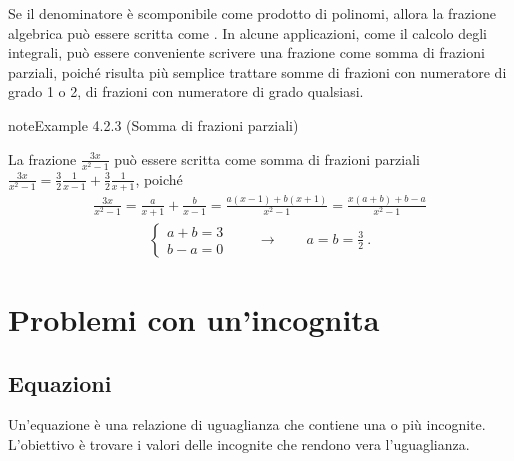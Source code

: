 \documentclass[letterpaper,10pt,italian]{jupyterBook}
\begin{document}
\sphinxAtStartPar
Se il denominatore è scomponibile come prodotto di polinomi, allora la frazione algebrica può essere scritta come . In alcune applicazioni, come il calcolo degli integrali, può essere conveniente scrivere una frazione come somma di frazioni parziali, poiché risulta più semplice trattare somme di frazioni con numeratore di grado 1 o 2, di frazioni con numeratore di grado qualsiasi.
\label{ch/algebra/real-algebra:real-algebra-fraction-sum-partial}
\begin{sphinxadmonition}{note}{Example 4.2.3 (Somma di frazioni parziali)}



\sphinxAtStartPar
La frazione \(\frac{3x}{x^2-1}\) può essere scritta come somma di frazioni parziali \(\frac{3 x}{x^2-1} = \frac{3}{2} \frac{1}{x-1} + \frac{3}{2}\frac{1}{x+1}\), poiché
\begin{equation*}
\begin{split}\frac{3x}{x^2-1} = \frac{a}{x+1} + \frac{b}{x-1} = \frac{a(x-1) + b(x+1)}{x^2-1} = \frac{x(a+b)+b-a}{x^2-1}\end{split}
\end{equation*}\begin{equation*}
\begin{split}\begin{cases} a + b = 3 \\ b - a = 0 \end{cases} \qquad \rightarrow \qquad a = b = \frac{3}{2} \ .\end{split}
\end{equation*}\end{sphinxadmonition}


\section{Problemi con un’incognita}
\label{\detokenize{ch/algebra/real-algebra:problemi-con-un-incognita}}

\subsection{Equazioni}
\label{\detokenize{ch/algebra/real-algebra:equazioni}}\label{\detokenize{ch/algebra/real-algebra:math-hs-algebra-real-eq}}
\sphinxAtStartPar
Un’equazione è una relazione di uguaglianza che contiene una o più incognite. L’obiettivo è trovare i valori delle incognite che rendono vera l’uguaglianza.
\end{document}
